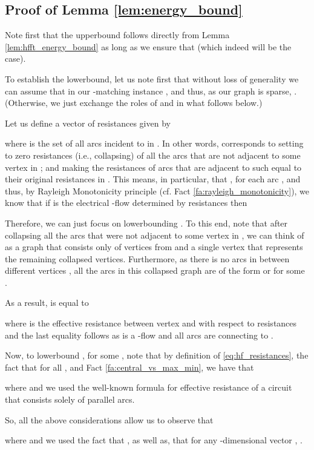 \documentclass[11pt, letterpaper]{article}
\begin{document}
\subsection{Proof of Lemma \ref{lem:energy_bound}}\label{app:energy_bound}


Note first that the upperbound follows directly from Lemma \ref{lem:hfft_energy_bound} as long as we ensure that  (which indeed will be the case). 

To establish the lowerbound, let us note first that without loss of generality we can assume that in our -matching instance ,  and thus, as our graph  is sparse, . (Otherwise, we just exchange the roles of  and  in what follows below.)  

Let us define a vector of resistances  given by

where  is the set of all arcs incident to  in . In other words,  corresponds to setting to zero resistances (i.e., collapsing) of all the arcs that are not adjacent to some vertex in ; and making the resistances of arcs that are adjacent to such  equal to their original resistances in . This means, in particular, that , for each arc , and thus, by Rayleigh Monotonicity principle (cf. Fact \ref{fa:rayleigh_monotonicity}), we know that if  is the electrical -flow determined by resistances  then


Therefore, we can just focus on lowerbounding . To this end, note that after collapsing all the arcs that were not adjacent to some vertex in , we can think of  as a graph that consists only of vertices from  and a single vertex  that represents the remaining collapsed vertices. Furthermore, as there is no arcs in  between different vertices , all the arcs in this collapsed graph are of the form  or  for some .

As a result,  is equal to

where  is the effective resistance between vertex  and  with respect to resistances  and the last equality follows as  is a -flow and all arcs are connecting to . 

Now, to lowerbound , for some , note that by definition of  \eqref{eq:hf_resistances}, the fact that  for all , and Fact \ref{fa:central_vs_max_min}, we have that

where  and we used the well-known formula for effective resistance of a circuit that consists solely of parallel arcs. 

So, all the above considerations allow us to observe that

where  and we used the fact that , as well as, that for any -dimensional vector , . 
\end{document}
